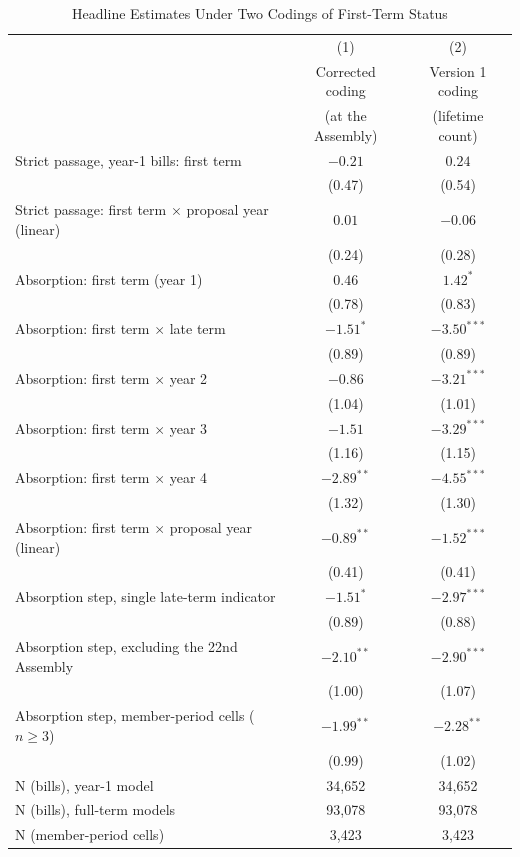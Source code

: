 \documentclass[11pt]{article}
\begin{document}
\begin{table}[H]
\centering
\singlespacing
\caption{Headline Estimates Under Two Codings of First-Term Status}
\label{tab:coding}
\small
\begin{tabular}{p{}cc}
\toprule
& (1) & (2) \\
& Corrected coding & Version 1 coding \\
& (at the Assembly) & (lifetime count) \\
\midrule
Strict passage, year-1 bills: first term & $-0.21$ & $0.24$ \\
& (0.47) & (0.54) \\
Strict passage: first term $\times$ proposal year (linear) & $0.01$ & $-0.06$ \\
& (0.24) & (0.28) \\
Absorption: first term (year 1) & $0.46$ & $1.42^{*}$ \\
& (0.78) & (0.83) \\
Absorption: first term $\times$ late term & $-1.51^{*}$ & $-3.50^{***}$ \\
& (0.89) & (0.89) \\
Absorption: first term $\times$ year 2 & $-0.86$ & $-3.21^{***}$ \\
& (1.04) & (1.01) \\
Absorption: first term $\times$ year 3 & $-1.51$ & $-3.29^{***}$ \\
& (1.16) & (1.15) \\
Absorption: first term $\times$ year 4 & $-2.89^{**}$ & $-4.55^{***}$ \\
& (1.32) & (1.30) \\
Absorption: first term $\times$ proposal year (linear) & $-0.89^{**}$ & $-1.52^{***}$ \\
& (0.41) & (0.41) \\
Absorption step, single late-term indicator & $-1.51^{*}$ & $-2.97^{***}$ \\
& (0.89) & (0.88) \\
Absorption step, excluding the 22nd Assembly & $-2.10^{**}$ & $-2.90^{***}$ \\
& (1.00) & (1.07) \\
Absorption step, member-period cells ($n \geq 3$) & $-1.99^{**}$ & $-2.28^{**}$ \\
& (0.99) & (1.02) \\
\midrule
N (bills), year-1 model & 34,652 & 34,652 \\
N (bills), full-term models & 93,078 & 93,078 \\
N (member-period cells) & 3,423 & 3,423 \\

\end{tabular}
\end{table}
\end{document}

